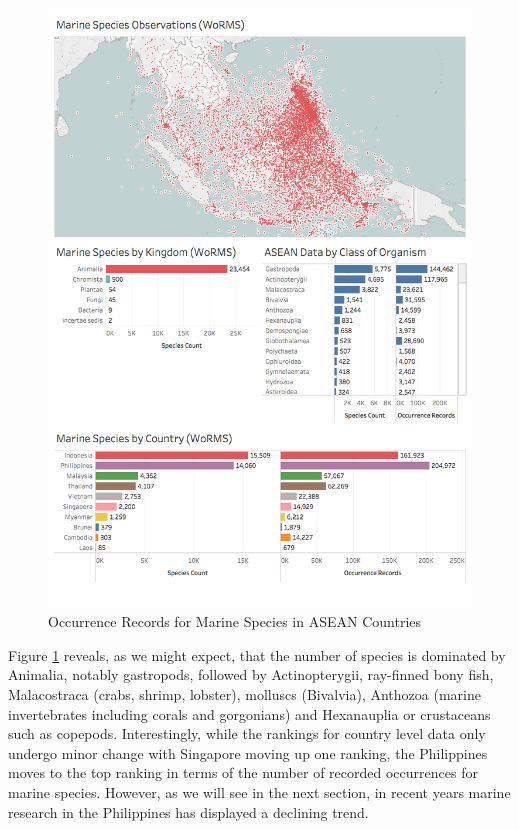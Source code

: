 \documentclass[openany]{book}
\theoremstyle{definition}
\theoremstyle{definition}
\theoremstyle{definition}
\theoremstyle{remark}
\begin{document}
\begin{figure}

{\centering \includegraphics[width=1\linewidth]{images/asean_marine_biodiversity} 

}

\caption{Occurrence Records for Marine Species in ASEAN Countries}\label{fig:marine}
\end{figure}

Figure \ref{fig:marine} reveals, as we might expect, that the number of
species is dominated by Animalia, notably gastropods, followed by
Actinopterygii, ray-finned bony fish, Malacostraca (crabs, shrimp,
lobster), molluscs (Bivalvia), Anthozoa (marine invertebrates including
corals and gorgonians) and Hexanauplia or crustaceans such as copepods.
Interestingly, while the rankings for country level data only undergo
minor change with Singapore moving up one ranking, the Philippines moves
to the top ranking in terms of the number of recorded occurrences for
marine species. However, as we will see in the next section, in recent
years marine research in the Philippines has displayed a declining
trend.
\end{document}
